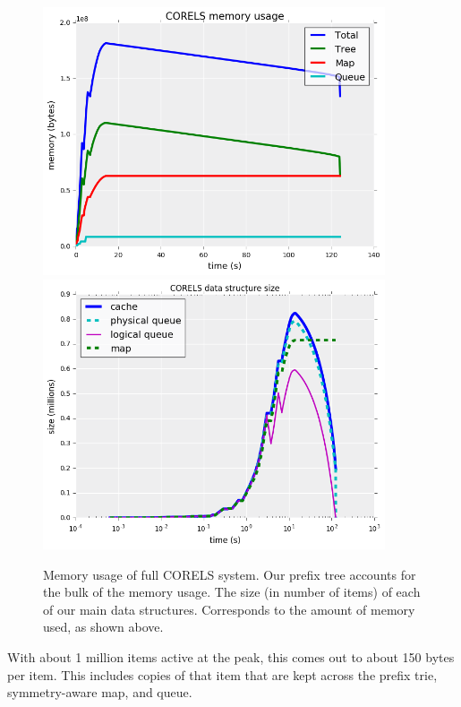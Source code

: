 \begin{figure}
\begin{center}
\begin{minipage}{\textwidth}
\includegraphics[width=0.9\textwidth]{figs/corels_mem.png}
\includegraphics[width=0.9\textwidth]{figs/corels_size.png}
\caption{Memory usage of full CORELS system. 
Our prefix tree accounts for the bulk of the memory usage.
The size (in number of items) of each of our main data structures.
Corresponds to the amount of memory used, as shown above.}
\end{minipage}
\end{center}
\label{fig:corels-mem}
\end{figure}

With about 1 million items active at the peak, this comes out to about 150 bytes per item.
This includes copies of that item that are kept across the prefix trie, symmetry-aware map, and queue.

